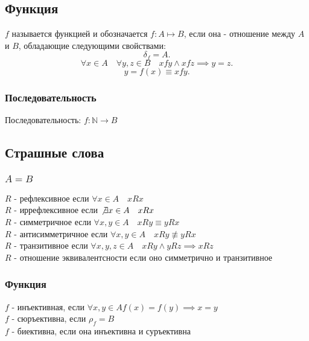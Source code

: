 \documentclass[11pt, oneside]{article}   	%
\begin{document}
    \subsection{Функция}
    $f$ называется функцией и обозначается  $f: A \mapsto B$, если она - отношение между $A$ и  $B$, обладающие следующими свойствами:
         \[ \delta_f = A .\]
         \[ \forall{x \in A}\quad\forall{y, z \in B}\quad xfy\land xfz \implies y=z .\]
         \[ y=f(x) \equiv xfy .\]
         \subsubsection{Последовательность}
         Последовательность: $f : \mathbb{N} \to B$ 

    \subsection{Страшные слова}
        \subsubsection{$A = B$}
            $R$ - рефлексивное если  $\forall{x \in A}\quad xRx$\\ 
            $R$ -  иррефлексивное если $\not\exists{x \in A}\quad xRx$\\
            $R$ - симметричное если  $\forall{x, y \in A}\quad xRy \equiv yRx$\\
            $R$ - антисимметричное если  $\forall{x, y \in A}\quad xRy \not\equiv yRx$ \\
            $R$ - транзитивное если $\forall{x, y, z \in A}\quad xRy\land yRz \implies xRz$\\
            $R$ - отношение эквивалентсности если оно симметрично и транзитивное\\
        \subsubsection{Функция}
            $f$ - инъективная, если  $\forall{x, y \in A} f(x) = f(y) \implies x = y$\\ 
            $f$ - сюръективна, если  $\rho_f = B$\\
            $f$ - биективна, если она инъективна и суръективна
\end{document}
